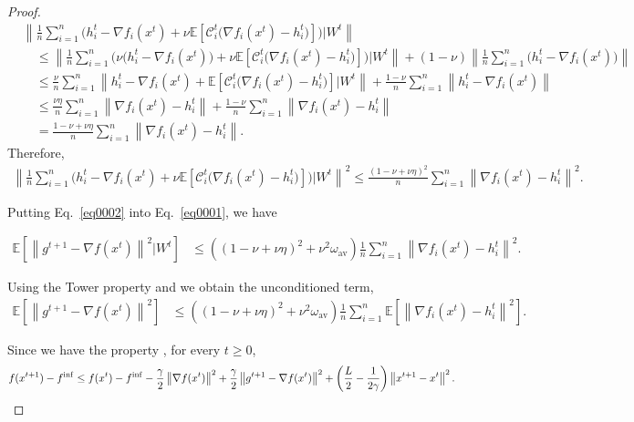 \documentclass{article} %
\theoremstyle{plain}
\theoremstyle{definition}
\theoremstyle{remark}
\newcommand{\kai}[1]{\todo[inline]{{\textbf{Kai:} \emph{#1}}}}
\newcommand{\sqnorm}[1]{\left\| #1 \right\|^2}
\newcommand{\Exp}[1]{\mathbb{E}\!\left[ #1 \right]}
\newcommand{\oma}{\omega_{\mathrm{av}}}
\begin{document}
\begin{proof}
   \begin{equation}\label{eq0002}
   \begin{aligned}
      &\left\|\frac{1}{n}\sum_{i=1}^n \Big(h_i^{t}-\nabla f_i(x^t) +\nu \Exp{\mathcal{C}_i^t\big(\nabla f_i(x^t)-h_i^t\big)} \Big) | W^t\right\|\\
      &\quad \leq \left\|\frac{1}{n}\sum_{i=1}^n \Big(\nu\big(h_i^{t}-\nabla f_i(x^t)\big) +\nu \Exp{\mathcal{C}_i^t\big(\nabla f_i(x^t)-h_i^t\big)} \Big) | W^t\right\| + (1-\nu)\left\|\frac{1}{n}\sum_{i=1}^n \big(h_i^{t}-\nabla f_i(x^t)\big)\right\|\\
      &\quad \leq \frac{\nu}{n}\sum_{i=1}^n\left\|h_i^{t}-\nabla f_i(x^t)+ \Exp{\mathcal{C}_i^t\big(\nabla f_i(x^t)-h_i^t\big)} | W^t\right\| + \frac{1-\nu}{n}\sum_{i=1}^n \left\|h_i^{t}-\nabla f_i(x^t)\right\|\\
      &\quad \leq  \frac{\nu\eta}{n}\sum_{i=1}^n \left\|\nabla f_i(x^t)-h_i^{t}\right\|+ \frac{1-\nu}{n}\sum_{i=1}^n \left\|\nabla f_i(x^t)-h_i^{t}\right\|\\
      & \quad = \frac{1-\nu+\nu\eta}{n}\sum_{i=1}^n \left\|\nabla f_i(x^t)-h_i^{t}\right\|.
   \end{aligned}
   \end{equation}
   Therefore, 
   \begin{align*}
   \sqnorm{\frac{1}{n}\sum_{i=1}^n \Big(h_i^{t}-\nabla f_i(x^t) +\nu \Exp{\mathcal{C}_i^t\big(\nabla f_i(x^t)-h_i^t\big)} \Big) | W^t} \leq \frac{(1-\nu+\nu\eta)^2}{n}\sum_{i=1}^n \sqnorm{\nabla f_i(x^t)-h_i^{t}}.
   \end{align*}

   Putting Eq.~\ref{eq0002} into Eq.~\ref{eq0001}, we have 
   
   \begin{align*}
   \Exp{\sqnorm{g^{t+1}-\nabla f(x^t)}| W^t} &\leq 
   \left((1-\nu+\nu\eta)^2+\nu^2\oma\right)\frac{1}{n}\sum_{i=1}^n \sqnorm{\nabla f_i(x^t)-h_i^{t}}.
   \end{align*}

   Using the Tower property and we obtain the unconditioned term,
   \begin{align*}
      \Exp{\sqnorm{g^{t+1}-\nabla f(x^t)}} &\leq 
      \left((1-\nu+\nu\eta)^2+\nu^2\oma\right)\frac{1}{n}\sum_{i=1}^n \Exp{\sqnorm{\nabla f_i(x^t)-h_i^{t}}}.
      \end{align*}
    
   Since we have the property \citep[Lemma 4]{ric21}, for every $t\geq 0$,
   \begin{align}
   f(x^{t+1}) -f^{\inf} &\leq f(x^t)  -f^{\inf} -\frac{\gamma}{2} \sqnorm{\nabla f(x^t)} +\frac{ \gamma }{2}\sqnorm{g^{t+1}-\nabla f(x^t)} + \left(\frac{ L}{2}-\frac{1}{2\gamma}\right)\sqnorm{x^{t+1}-x^t}.\notag
   \end{align}


\end{proof}
\end{document}
